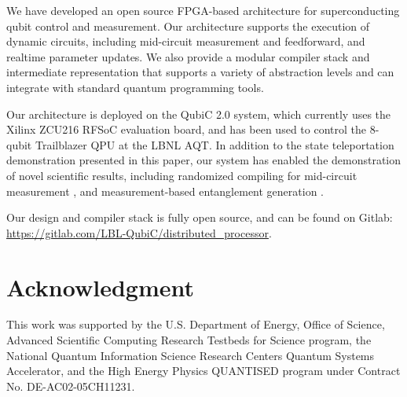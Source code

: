 \documentclass[journal]{IEEEtran}
\begin{document}
We have developed an open source FPGA-based architecture for superconducting qubit control and measurement. Our architecture supports the execution of dynamic circuits, including mid-circuit measurement and feedforward, and realtime parameter updates. We also provide a modular compiler stack and intermediate representation that supports a variety of abstraction levels and can integrate with standard quantum programming tools.

Our architecture is deployed on the QubiC 2.0 \cite{xu2023qubic} system, which currently uses the Xilinx ZCU216 RFSoC evaluation board, and has been used to control the 8-qubit Trailblazer QPU at the LBNL AQT. In addition to the state teleportation demonstration presented in this paper, our system has enabled the demonstration of novel scientific results, including randomized compiling for mid-circuit measurement \cite{hashim2024quasiprobabilistic}, and measurement-based entanglement generation \cite{hashim2024efficient}.

Our design and compiler stack is fully open source, and can be found on Gitlab: \url{https://gitlab.com/LBL-QubiC/distributed_processor}. 



\appendices

\section*{Acknowledgment}

This work was supported by the U.S. Department of Energy, Office of Science, Advanced Scientific Computing Research Testbeds for Science program, the National Quantum Information Science Research Centers Quantum Systems Accelerator, and the High Energy Physics QUANTISED program under Contract No. DE-AC02-05CH11231.


\ifCLASSOPTIONcaptionsoff
  \newpage
\fi





%
%
%


\end{document}
